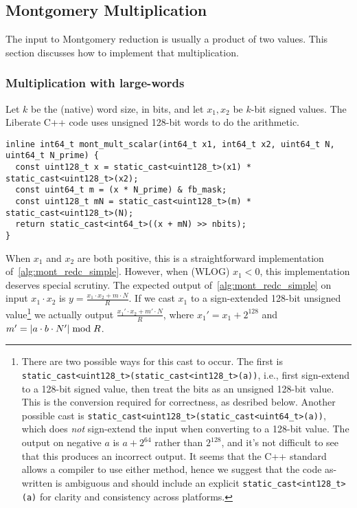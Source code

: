 \documentclass[../fheimpl.tex]{subfiles}
\begin{document}
\subsection{Montgomery Multiplication}
The input to Montgomery reduction is usually a product of two values. This section discusses how to implement that multiplication.

\subsubsection{Multiplication with large-words}
Let $k$ be the (native) word size, in bits, and let $x_1, x_2$ be $k$-bit signed values. The Liberate C++ code uses unsigned 128-bit words to do the arithmetic. 

\begin{verbatim}
inline int64_t mont_mult_scalar(int64_t x1, int64_t x2, uint64_t N, uint64_t N_prime) {
  const uint128_t x = static_cast<uint128_t>(x1) * static_cast<uint128_t>(x2);
  const uint64_t m = (x * N_prime) & fb_mask;
  const uint128_t mN = static_cast<uint128_t>(m) * static_cast<uint128_t>(N);
  return static_cast<int64_t>((x + mN) >> nbits);
}
\end{verbatim}
When $x_1$ and $x_2$ are both positive, this is a straightforward implementation of~\cref{alg:mont_redc_simple}. However, when (WLOG) $x_1<0$, this implementation deserves special scrutiny. The expected output of~\cref{alg:mont_redc_simple} on input $x_1\cdot x_2$ is $y=\frac{x_1\cdot x_2+m\cdot N}{R}$. If we cast $x_1$ to a sign-extended 128-bit unsigned value\footnote{There are two possible ways for this cast to occur. The first is \texttt{static_cast<uint128_t>(static_cast<int128_t>(a))}, i.e., first sign-extend to a 128-bit signed value, then treat the bits as an unsigned 128-bit value. This is the conversion required for correctness, as desribed below. Another possible cast is \texttt{static_cast<uint128_t>(static_cast<uint64_t>(a))}, which does \emph{not} sign-extend the input when converting to a 128-bit value. The output on negative $a$ is $a+2^{64}$ rather than $2^{128}$, and it's not difficult to see that this produces an incorrect output. It seems that the C++ standard allows a compiler to use either method, hence we suggest that the code as-written is ambiguous and should include an explicit \texttt{static_cast<int128_t>(a)} for clarity and consistency across platforms.} we actually output $\frac{x_1'\cdot x_2+m'\cdot N}{R}$, where $x_1'=x_1+2^{128}$ and $m' = \lvert a\cdot b\cdot N'\rvert\bmod R$.
\end{document}
